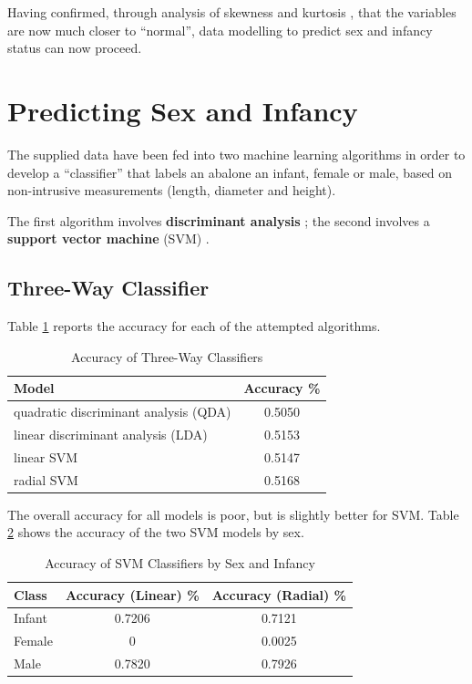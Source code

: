 \documentclass[11pt, a4paper]{article}
\begin{document}
    Having confirmed, through analysis of skewness and kurtosis \parencite{assumptions}, that the variables are now much closer to ``normal'', data modelling to predict sex and infancy status can now proceed.

    \section{Predicting Sex and Infancy}

    The supplied data have been fed into two machine learning algorithms in order to develop a ``classifier'' that labels an abalone an infant, female or male, based on non-intrusive measurements (length, diameter and height). 

    The first algorithm involves \textbf{discriminant analysis} \parencite{da}; the second involves a \textbf{support vector machine} (SVM) \parencite{svm}.

    \subsection{Three-Way Classifier}

    Table \ref{three-way} reports the accuracy for each of the attempted algorithms.

    \begin{table}[ht]
        \centering
        \begin{tabular}{|l|c|}
            \hline
            Model & Accuracy \% \\
            \hline
            quadratic discriminant analysis (QDA) & 0.5050 \\
            linear discriminant analysis (LDA) & 0.5153 \\
            linear SVM & 0.5147 \\
            radial SVM & 0.5168 \\
            \hline
        \end{tabular}
        \caption{Accuracy of Three-Way Classifiers}
        \label{three-way}
    \end{table}

    The overall accuracy for all models is poor, but is slightly better for SVM. Table \ref{svm-acc} shows the accuracy of the two SVM models by sex.

    \begin{table}[ht]
        \centering
        \begin{tabular}{|l|c|c|}
            \hline
            Class & Accuracy (Linear) \% & Accuracy (Radial) \% \\
            \hline
            Infant & 0.7206 & 0.7121 \\
            Female & 0 & 0.0025 \\
            Male & 0.7820 & 0.7926 \\
            \hline
        \end{tabular}
        \caption{Accuracy of SVM Classifiers by Sex and Infancy}
        \label{svm-acc}
    \end{table}
\end{document}

